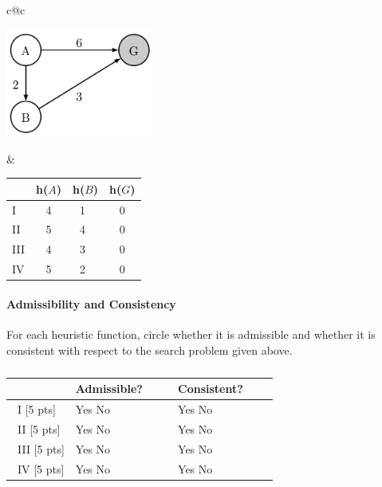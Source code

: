 \begin{tabular}{c@{\hspace{0.1\linewidth}}c}

\begin{minipage}{0.45\linewidth}

\centering
\includegraphics[height=1.4in]{figures/heuristic_triangle.pdf}

\end{minipage}

&

\begin{minipage}{0.45\linewidth}

  {\large
  \begin{tabular}{|l|ccc|}
      \hline
      & h($A$) & h($B$) & h($G$) \\ \hline
  I   & 4    & 1 & 0    \\ \hline
  II  & 5    & 4 & 0    \\ \hline
  III & 4    & 3 & 0    \\ \hline
  IV  & 5    & 2 & 0    \\ \hline
  \end{tabular}
  }

\end{minipage}
\end{tabular}


\paragraph*{\bf Admissibility and Consistency}

For each heuristic function, circle whether it is admissible and whether it is consistent with respect to the search problem given above.

\vspace{.5cm}
\begin{table}[!h]
\caption{}
\centering
\begin{tabular}{|m{0.8in}|m{0.8in} m{0in}|m{0.8in} m{0in}|}
   \hline
   ~   & Admissible?                     & ~ & Consistent?                     & ~ \\ [0.15in] \hline
   I [5 pts]  & {\color{red} Yes} \hfill No  & ~ & Yes \hfill {\color{red} No}  & ~ \\ [0.15in] \hline
   II [5 pts] & Yes \hfill {\color{red} No}  & ~ & Yes \hfill {\color{red} No}  & ~ \\ [0.15in] \hline
   III [5 pts] & {\color{red} Yes} \hfill No  & ~ & {\color{red} Yes} \hfill No  & ~ \\ [0.15in] \hline
   IV [5 pts] & {\color{red} Yes} \hfill No  & ~ & Yes \hfill {\color{red} No}  & ~ \\ [0.15in] \hline
\end{tabular}
\end{table}